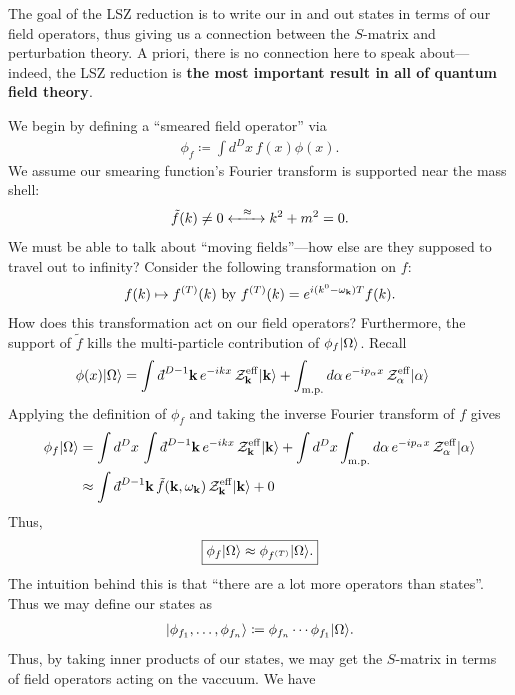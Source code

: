\documentclass[11pt]{article}
\begin{document}
The goal of the LSZ reduction is to write our in and out
states in terms of our field operators, thus giving us a
connection between the $S$-matrix and perturbation theory.
A priori, there is no connection here to speak about---indeed, 
the LSZ reduction is \textbf{the most important
result in all of quantum field theory}.

We begin by defining a ``smeared field operator'' via
\begin{align*}
    \phi_f \coloneqq \int d^D x \, f(x) \phi(x).
\end{align*}
We assume our smearing function's Fourier transform is supported 
near the mass shell:
\begin{align*}
    \tilde{f}(k) \neq 0 \xleftrightarrow{\: \: \: \: \approx \: \: \: \:} k^2 + m^2 = 0.
\end{align*}
We must be able to talk about ``moving fields''---how else
are they supposed to travel out to infinity?
Consider the following transformation on $f$:
\begin{align*}
    f(k) \mapsto f^{(T)}(k) \text{ by } f^{(T)}(k) = e^{i(k^0 - \omega_{\mathbf{k}})T} f(k).
\end{align*}
How does this transformation act on our field operators?
Furthermore, the support of $\tilde{f}$ kills the
multi-particle contribution of $\phi_{f} \lvert\Omega\rangle$.
Recall
\begin{align*}
    \phi(x) \ket{\Omega} & = \int \dbar^{D - 1} \bfk \, e^{-ikx}\, \mathcal{Z}^{\rm eff}_{\bfk} \ket{\bfk}
    + \int_{\rm m.p.} d\alpha \, e^{-ip_\alpha x} \, \mathcal{Z}^{\rm eff}_{\alpha} \ket{\alpha}
\end{align*}
Applying the definition of $\phi_f$ and taking the inverse 
Fourier transform of $f$ gives
\begin{align*}
    \phi_f \ket{\Omega} & = \int d^D x \, \int \dbar^{D - 1} \bfk \, e^{-ikx}\, \mathcal{Z}^{\rm eff}_{\bfk} \ket{\bfk}
    + \int d^D x \int_{\rm m.p.} d\alpha \, e^{-ip_\alpha x} \, \mathcal{Z}^{\rm eff}_{\alpha} \ket{\alpha}\\
    & \approx \int \dbar^{D - 1} \bfk \, \tilde{f}(\bfk, \omega_\bfk)\, \mathcal{Z}^{\rm eff}_{\bfk} \ket{\bfk} + 0
\end{align*}
Thus,
\begin{align*}
    \boxed{\phi_f \lvert\Omega\rangle \approx \phi_{f^{(T)}} \lvert\Omega\rangle.}
\end{align*}
The intuition behind this is that ``there are a lot more operators than
states''. Thus we may define our states as
\begin{align*}
    \lvert\phi_{f_1}, \ldots, \phi_{f_n}\rangle \coloneqq \phi_{f_n} \cdots \phi_{f_1} \lvert\Omega\rangle.
\end{align*}
Thus, by taking inner products of our states, we may get the $S$-matrix
in terms of field operators acting on the vaccuum. We have 
\end{document}
